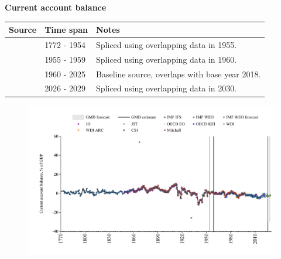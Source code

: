 \documentclass[12pt,a4paper,landscape]{article}
\begin{document}
\begin{adjustbox}{max totalsize={\paperwidth}{\paperheight},center}
\begin{minipage}[t][\textheight][t]{\textwidth}
\vspace*{0.5cm}
{}
\begin{center}
{\Large\bfseries Current account balance}
\end{center}
\vspace{0.5cm}
\begin{table}[H]
\centering
\small
\begin{tabular}{|l|l|l|}
\hline
\textbf{Source} & \textbf{Time span} & \textbf{Notes} \\
\hline
\rowcolor{white}\cite{CS1_GBR}& 1772 - 1954 &Spliced using overlapping data in 1955. \\
\rowcolor{lightgray}\cite{OECD_KEI}& 1955 - 1959 &Spliced using overlapping data in 1960. \\
\rowcolor{white}\cite{OECD_EO}& 1960 - 2025 &Baseline source, overlaps with base year 2018. \\
\rowcolor{lightgray}\cite{IMF_WEO_forecast}& 2026 - 2029 &Spliced using overlapping data in 2030. \\
\hline
\end{tabular}
\end{table}
\begin{figure}[H]
\centering
\includegraphics[width=\textwidth,height=0.6\textheight,keepaspectratio]{graphs/GBR_CA_GDP.pdf}
\end{figure}
\end{minipage}
\end{adjustbox}
\end{document}
